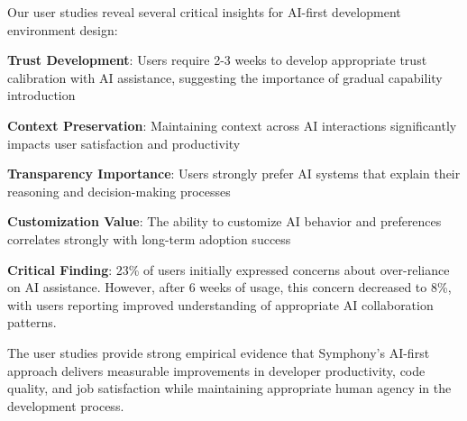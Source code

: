 Our user studies reveal several critical insights for AI-first development environment design:

\begin{expandedlist}
    \item \textbf{Trust Development}: Users require 2-3 weeks to develop appropriate trust calibration with AI assistance, suggesting the importance of gradual capability introduction
    \item \textbf{Context Preservation}: Maintaining context across AI interactions significantly impacts user satisfaction and productivity
    \item \textbf{Transparency Importance}: Users strongly prefer AI systems that explain their reasoning and decision-making processes
    \item \textbf{Customization Value}: The ability to customize AI behavior and preferences correlates strongly with long-term adoption success
\end{expandedlist}

\begin{alertbox}
\textbf{Critical Finding}: 23\% of users initially expressed concerns about over-reliance on AI assistance. However, after 6 weeks of usage, this concern decreased to 8\%, with users reporting improved understanding of appropriate AI collaboration patterns.
\end{alertbox}

The user studies provide strong empirical evidence that Symphony's AI-first approach delivers measurable improvements in developer productivity, code quality, and job satisfaction while maintaining appropriate human agency in the development process.